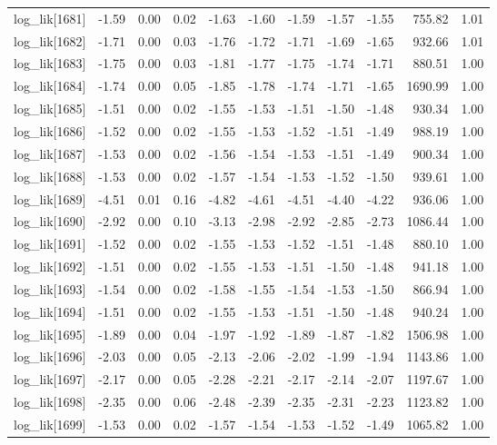 \begin{table}[ht]
\begin{tabular}{rrrrrrrrrrr}
  log\_lik[1681] & -1.59 & 0.00 & 0.02 & -1.63 & -1.60 & -1.59 & -1.57 & -1.55 & 755.82 & 1.01 \\ 
  log\_lik[1682] & -1.71 & 0.00 & 0.03 & -1.76 & -1.72 & -1.71 & -1.69 & -1.65 & 932.66 & 1.01 \\ 
  log\_lik[1683] & -1.75 & 0.00 & 0.03 & -1.81 & -1.77 & -1.75 & -1.74 & -1.71 & 880.51 & 1.00 \\ 
  log\_lik[1684] & -1.74 & 0.00 & 0.05 & -1.85 & -1.78 & -1.74 & -1.71 & -1.65 & 1690.99 & 1.00 \\ 
  log\_lik[1685] & -1.51 & 0.00 & 0.02 & -1.55 & -1.53 & -1.51 & -1.50 & -1.48 & 930.34 & 1.00 \\ 
  log\_lik[1686] & -1.52 & 0.00 & 0.02 & -1.55 & -1.53 & -1.52 & -1.51 & -1.49 & 988.19 & 1.00 \\ 
  log\_lik[1687] & -1.53 & 0.00 & 0.02 & -1.56 & -1.54 & -1.53 & -1.51 & -1.49 & 900.34 & 1.00 \\ 
  log\_lik[1688] & -1.53 & 0.00 & 0.02 & -1.57 & -1.54 & -1.53 & -1.52 & -1.50 & 939.61 & 1.00 \\ 
  log\_lik[1689] & -4.51 & 0.01 & 0.16 & -4.82 & -4.61 & -4.51 & -4.40 & -4.22 & 936.06 & 1.00 \\ 
  log\_lik[1690] & -2.92 & 0.00 & 0.10 & -3.13 & -2.98 & -2.92 & -2.85 & -2.73 & 1086.44 & 1.00 \\ 
  log\_lik[1691] & -1.52 & 0.00 & 0.02 & -1.55 & -1.53 & -1.52 & -1.51 & -1.48 & 880.10 & 1.00 \\ 
  log\_lik[1692] & -1.51 & 0.00 & 0.02 & -1.55 & -1.53 & -1.51 & -1.50 & -1.48 & 941.18 & 1.00 \\ 
  log\_lik[1693] & -1.54 & 0.00 & 0.02 & -1.58 & -1.55 & -1.54 & -1.53 & -1.50 & 866.94 & 1.00 \\ 
  log\_lik[1694] & -1.51 & 0.00 & 0.02 & -1.55 & -1.53 & -1.51 & -1.50 & -1.48 & 940.24 & 1.00 \\ 
  log\_lik[1695] & -1.89 & 0.00 & 0.04 & -1.97 & -1.92 & -1.89 & -1.87 & -1.82 & 1506.98 & 1.00 \\ 
  log\_lik[1696] & -2.03 & 0.00 & 0.05 & -2.13 & -2.06 & -2.02 & -1.99 & -1.94 & 1143.86 & 1.00 \\ 
  log\_lik[1697] & -2.17 & 0.00 & 0.05 & -2.28 & -2.21 & -2.17 & -2.14 & -2.07 & 1197.67 & 1.00 \\ 
  log\_lik[1698] & -2.35 & 0.00 & 0.06 & -2.48 & -2.39 & -2.35 & -2.31 & -2.23 & 1123.82 & 1.00 \\ 
  log\_lik[1699] & -1.53 & 0.00 & 0.02 & -1.57 & -1.54 & -1.53 & -1.52 & -1.49 & 1065.82 & 1.00 \\ 

\end{tabular}
\end{table}
